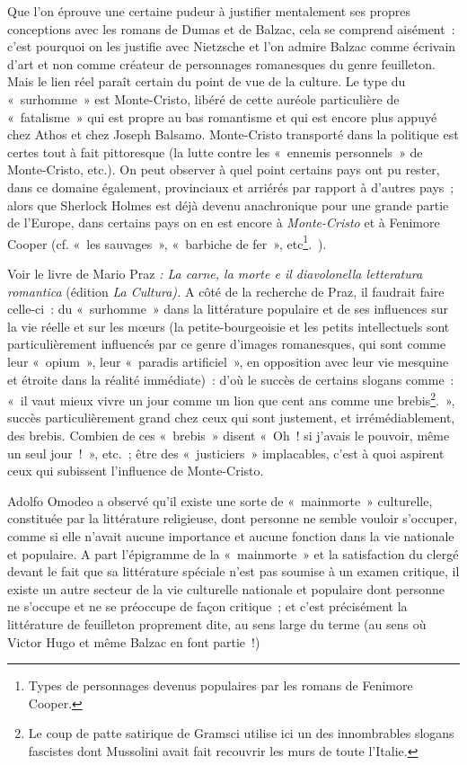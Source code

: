 \documentclass[french,twoside]{book} %
\begin{document}
Que l’on éprouve une certaine pudeur à justifier mentalement ses propres conceptions avec les romans de Dumas et de Balzac, cela se comprend aisément : c’est pourquoi on les justifie avec Nietzsche et l’on admire Balzac comme écrivain d’art et non comme créateur de personnages romanesques du genre feuilleton. Mais le lien réel paraît certain du point de vue de la culture. Le type du « surhomme » est Monte-Cristo, libéré de cette auréole particulière de « fatalisme » qui est propre au bas romantisme et qui est encore plus appuyé chez Athos et chez Joseph Balsamo. Monte-Cristo transporté dans la politique est certes tout à fait pittoresque (la lutte contre les « ennemis personnels » de Monte-Cristo, etc.). On peut observer à quel point certains pays ont pu rester, dans ce domaine également, provinciaux et arriérés par rapport à d’autres pays ; alors que Sherlock Holmes est déjà devenu anachronique pour une grande partie de l’Europe, dans certains pays on en est encore à \emph{Monte-Cristo} et à Fenimore Cooper (cf. « les sauvages », « barbiche de fer », etc\footnote{Types de personnages devenus populaires par les romans de Fenimore Cooper.}. ).\par
Voir le livre de Mario Praz \emph{: La carne, la morte e il diavolonella letteratura romantica} (édition \emph{La Cultura).} A côté de la recherche de Praz, il faudrait faire celle-ci : du « surhomme » dans la littérature populaire et de ses influences sur la vie réelle et sur les mœurs (la petite-bourgeoisie et les petits intellectuels sont particulièrement influencés par ce genre d’images romanesques, qui sont comme leur « opium », leur « paradis artificiel », en opposition avec leur vie mesquine et étroite dans la réalité immédiate) : d’où le succès de certains slogans comme : « il vaut mieux vivre un jour comme un lion que cent ans comme une brebis\footnote{Le coup de patte satirique de Gramsci utilise ici un des innombrables slogans fascistes dont Mussolini avait fait recouvrir les murs de toute l’Italie.}. », succès particulièrement grand chez ceux qui sont justement, et irrémédiablement, des brebis. Combien de ces « brebis » disent « Oh ! si j’avais le pouvoir, même un seul jour ! », etc. ; être des « justiciers » implacables, c’est à quoi aspirent ceux qui subissent l’influence de Monte-Cristo.\par
Adolfo Omodeo a observé qu’il existe une sorte de « mainmorte » culturelle, constituée par la littérature religieuse, dont personne ne semble vouloir s’occuper, comme si elle n’avait aucune importance et aucune fonction dans la vie nationale et populaire. A part l’épigramme de la « mainmorte » et la satisfaction du clergé devant le fait que sa littérature spéciale n’est pas soumise à un examen critique, il existe un autre secteur de la vie culturelle nationale et populaire dont personne ne s’occupe et ne se préoccupe de façon critique ; et c’est précisément la littérature de feuilleton proprement dite, au sens large du terme (au sens où Victor Hugo et même Balzac en font partie !)\par
\end{document}

